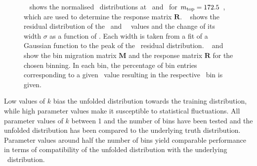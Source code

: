 \begin{figure}[tbp!]
{  \label{sfig:migrationmatrix}
}
\hfill
{}
\caption[Resolution and response for unfolding]{
%
\Fig~ shows the normalised \mlb\ distributions at \recol\ and \truelevel\ for $m_{\mathrm{top}}=172.5$~\GeV, which are used to determine the response matrix $\mathbf{R}$.
%
%
\Fig~ shows the residual distribution of the \recol\ and \truelevel\ \mlb\ values and  the change of its width $\sigma$ as a function of \mlbt. Each width is taken from a fit of a Gaussian function to the peak of the \mlb\ residual distribution.
%
~ and  show the bin migration matrix $\mathbf{M}$ and the response matrix $\mathbf{R}$ for the chosen binning. In each bin, the percentage of bin entries corresponding to a given \mlbt\ value resulting in the respective \mlbr\ bin is given.
%
\label{fig:unfoldresolution}
}
\end{figure}
%



Low values of $k$ bias the unfolded distribution towards the training distribution, while high parameter values make it susceptible to statistical fluctuations. All parameter values of $k$ between 1 and the number of bins have been tested and the unfolded distribution has been compared to the underlying truth distribution. Parameter values around half the number of bins yield comparable performance in terms of compatibility of the unfolded distribution with the underlying \truelevel\ distribution.


